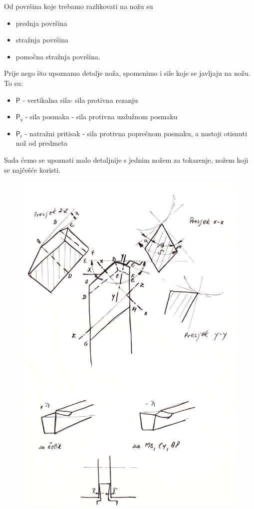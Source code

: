 \documentclass[a4paper,12pt]{article}
\numberwithin{figure}{section}
\begin{document}
Od površina koje trebamo razlikovati na nožu su
\begin{itemize}
\item prednja površina
\item stražnja površina
\item pomočna stražnja površina.
\end{itemize}
Prije nego što upoznamo detalje noža, spomenimo i sile koje se javljaju na nožu. To su:
\begin{itemize}
\item $\mathsf{P}$ - vertikalna sila- sila protivna rezanju
\item $\mathsf{P_{v}}$ - sila posmaka - sila protivna uzdužnom posmaku
\item $\mathsf{P_{r}}$ - natražni pritisak - sila protivna poprečnom posmaku, a nastoji otisnuti nož od predmeta
\end{itemize}
Sada ćemo se upoznati malo detaljnije s jednim nožem za tokarenje, nožem koji se najčešće koristi.
\begin{figure}[!h]
\centering
\includegraphics[width=\textwidth]{image_02.png}
\end{figure}
\end{document}
